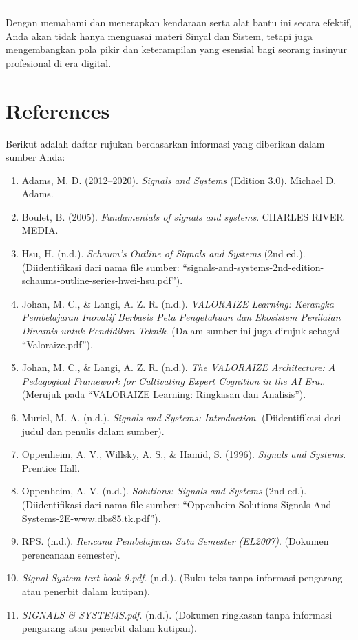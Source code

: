 \documentclass[
  letterpaper,
  DIV=11,
  numbers=noendperiod]{scrreprt}
\providecommand{\tightlist}{%
  \setlength{\itemsep}{0pt}\setlength{\parskip}{0pt}}
\begin{document}
\begin{center}\rule{0.5\linewidth}{0.5pt}\end{center}

Dengan memahami dan menerapkan kendaraan serta alat bantu ini secara
efektif, Anda akan tidak hanya menguasai materi Sinyal dan Sistem,
tetapi juga mengembangkan pola pikir dan keterampilan yang esensial bagi
seorang insinyur profesional di era digital.


\chapter*{References}\label{references}


Berikut adalah daftar rujukan berdasarkan informasi yang diberikan dalam
sumber Anda:

\begin{enumerate}
\def\labelenumi{\arabic{enumi}.}
\tightlist
\item
  Adams, M. D. (2012--2020). \emph{Signals and Systems} (Edition 3.0).
  Michael D. Adams.
\item
  Boulet, B. (2005). \emph{Fundamentals of signals and systems}. CHARLES
  RIVER MEDIA.
\item
  Hsu, H. (n.d.). \emph{Schaum's Outline of Signals and Systems} (2nd
  ed.). (Diidentifikasi dari nama file sumber:
  ``signals-and-systems-2nd-edition-schaums-outline-series-hwei-hsu.pdf'').
\item
  Johan, M. C., \& Langi, A. Z. R. (n.d.). \emph{VALORAIZE Learning:
  Kerangka Pembelajaran Inovatif Berbasis Peta Pengetahuan dan Ekosistem
  Penilaian Dinamis untuk Pendidikan Teknik}. (Dalam sumber ini juga
  dirujuk sebagai ``Valoraize.pdf'').
\item
  Johan, M. C., \& Langi, A. Z. R. (n.d.). \emph{The VALORAIZE
  Architecture: A Pedagogical Framework for Cultivating Expert Cognition
  in the AI Era}.. (Merujuk pada ``VALORAIZE Learning: Ringkasan dan
  Analisis'').
\item
  Muriel, M. A. (n.d.). \emph{Signals and Systems: Introduction}.
  (Diidentifikasi dari judul dan penulis dalam sumber).
\item
  Oppenheim, A. V., Willsky, A. S., \& Hamid, S. (1996). \emph{Signals
  and Systems}. Prentice Hall.
\item
  Oppenheim, A. V. (n.d.). \emph{Solutions: Signals and Systems} (2nd
  ed.). (Diidentifikasi dari nama file sumber:
  ``Oppenheim-Solutions-Signals-And-Systems-2E-www.dbs85.tk.pdf'').
\item
  RPS. (n.d.). \emph{Rencana Pembelajaran Satu Semester (EL2007)}.
  (Dokumen perencanaan semester).
\item
  \emph{Signal-System-text-book-9.pdf}. (n.d.). (Buku teks tanpa
  informasi pengarang atau penerbit dalam kutipan).
\item
  \emph{SIGNALS \& SYSTEMS.pdf}. (n.d.). (Dokumen ringkasan tanpa
  informasi pengarang atau penerbit dalam kutipan).
\end{enumerate}
\end{document}
